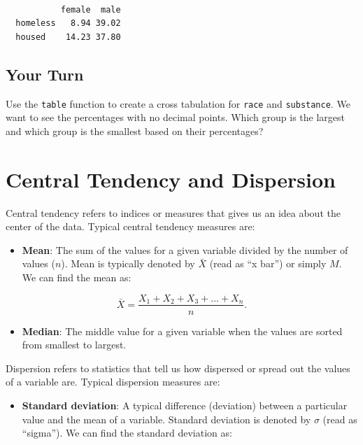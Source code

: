 \documentclass[]{book}
\providecommand{\tightlist}{%
  \setlength{\itemsep}{0pt}\setlength{\parskip}{0pt}}
\begin{document}
\begin{verbatim}
          
           female  male
  homeless   8.94 39.02
  housed    14.23 37.80
\end{verbatim}

\hypertarget{your-turn-4}{%
\subsection{Your Turn}\label{your-turn-4}}

Use the \texttt{table} function to create a cross tabulation for \texttt{race} and \texttt{substance}. We want to see the percentages with no decimal points. Which group is the largest and which group is the smallest based on their percentages?

\hypertarget{central-tendency-and-dispersion}{%
\section{Central Tendency and Dispersion}\label{central-tendency-and-dispersion}}

Central tendency refers to indices or measures that gives us an idea about the center of the data. Typical central tendency measures are:

\begin{itemize}
\tightlist
\item
  \textbf{Mean}: The sum of the values for a given variable divided by the number of values (\(n\)). Mean is typically denoted by \(\bar{X}\) (read as ``x bar'') or simply \(M\). We can find the mean as:
\end{itemize}

\[\bar{X} = \frac{X_1 + X_2 + X_3 + ...+ X_n}{n}.\]

\begin{itemize}
\tightlist
\item
  \textbf{Median}: The middle value for a given variable when the values are sorted from smallest to largest.
\end{itemize}

Dispersion refers to statistics that tell us how dispersed or spread out the values of a variable are. Typical dispersion measures are:

\begin{itemize}
\tightlist
\item
  \textbf{Standard deviation}: A typical difference (deviation) between a particular value and the mean of a variable. Standard deviation is denoted by \(\sigma\) (read as ``sigma''). We can find the standard deviation as:
\end{itemize}
\end{document}
